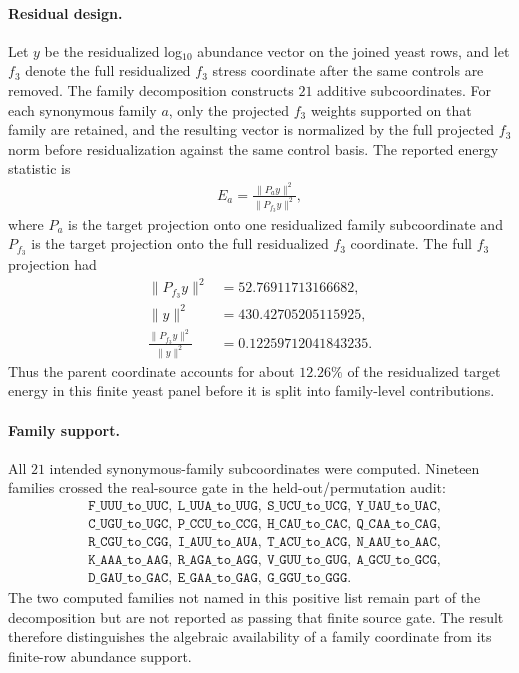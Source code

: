 \paragraph{Residual design.}
Let $y$ be the residualized log$_{10}$ abundance vector on the joined yeast rows, and let $f_3$ denote the full residualized $f_3$ stress coordinate after the same controls are removed.  The family decomposition constructs $21$ additive subcoordinates.  For each synonymous family $a$, only the projected $f_3$ weights supported on that family are retained, and the resulting vector is normalized by the full projected $f_3$ norm before residualization against the same control basis.  The reported energy statistic is
$$
\begin{aligned}
E_a = \frac{\|P_a y\|^2}{\|P_{f_3} y\|^2},
\end{aligned}
$$
where $P_a$ is the target projection onto one residualized family subcoordinate and $P_{f_3}$ is the target projection onto the full residualized $f_3$ coordinate.  The full $f_3$ projection had
$$
\begin{aligned}
\|P_{f_3}y\|^2 &= 52.76911713166682,\\
\|y\|^2 &= 430.42705205115925,\\
\frac{\|P_{f_3}y\|^2}{\|y\|^2} &= 0.12259712041843235.
\end{aligned}
$$
Thus the parent coordinate accounts for about $12.26\%$ of the residualized target energy in this finite yeast panel before it is split into family-level contributions.

\paragraph{Family support.}
All $21$ intended synonymous-family subcoordinates were computed.  Nineteen families crossed the real-source gate in the held-out/permutation audit:
$$
\begin{aligned}
&\texttt{F\_UUU\_to\_UUC},\ \texttt{L\_UUA\_to\_UUG},\ \texttt{S\_UCU\_to\_UCG},\ \texttt{Y\_UAU\_to\_UAC},\\
&\texttt{C\_UGU\_to\_UGC},\ \texttt{P\_CCU\_to\_CCG},\ \texttt{H\_CAU\_to\_CAC},\ \texttt{Q\_CAA\_to\_CAG},\\
&\texttt{R\_CGU\_to\_CGG},\ \texttt{I\_AUU\_to\_AUA},\ \texttt{T\_ACU\_to\_ACG},\ \texttt{N\_AAU\_to\_AAC},\\
&\texttt{K\_AAA\_to\_AAG},\ \texttt{R\_AGA\_to\_AGG},\ \texttt{V\_GUU\_to\_GUG},\ \texttt{A\_GCU\_to\_GCG},\\
&\texttt{D\_GAU\_to\_GAC},\ \texttt{E\_GAA\_to\_GAG},\ \texttt{G\_GGU\_to\_GGG}.
\end{aligned}
$$
The two computed families not named in this positive list remain part of the decomposition but are not reported as passing that finite source gate.  The result therefore distinguishes the algebraic availability of a family coordinate from its finite-row abundance support.


